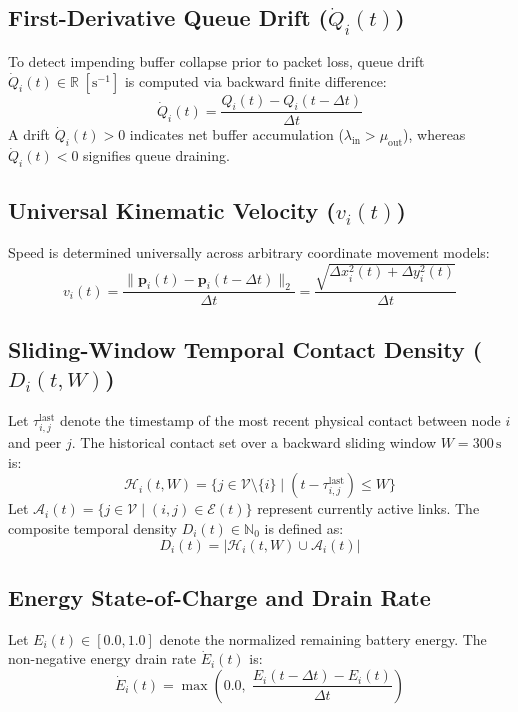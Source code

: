 \documentclass[journal,compsoc]{IEEEtran}
\begin{document}
\subsection{First-Derivative Queue Drift ($\dot{Q}_i(t)$)}
To detect impending buffer collapse prior to packet loss, queue drift $\dot{Q}_i(t) \in \mathbb{R}\;[\mathrm{s}^{-1}]$ is computed via backward finite difference:
\begin{equation}
\dot{Q}_i(t) = \frac{Q_i(t) - Q_i(t - \Delta t)}{\Delta t}
\end{equation}
A drift $\dot{Q}_i(t) > 0$ indicates net buffer accumulation ($\lambda_{\mathrm{in}} > \mu_{\mathrm{out}}$), whereas $\dot{Q}_i(t) < 0$ signifies queue draining.

\subsection{Universal Kinematic Velocity ($v_i(t)$)}
Speed is determined universally across arbitrary coordinate movement models:
\begin{equation}
v_i(t) = \frac{\|\mathbf{p}_i(t) - \mathbf{p}_i(t - \Delta t)\|_2}{\Delta t} = \frac{\sqrt{\Delta x_i^2(t) + \Delta y_i^2(t)}}{\Delta t}
\end{equation}

\subsection{Sliding-Window Temporal Contact Density ($D_i(t, W)$)}
Let $\tau_{i,j}^{\mathrm{last}}$ denote the timestamp of the most recent physical contact between node $i$ and peer $j$. The historical contact set over a backward sliding window $W = 300\,\mathrm{s}$ is:
\begin{equation}
\mathcal{H}_i(t, W) = \bigl\{ j \in \mathcal{V} \setminus \{i\} \;\big|\; (t - \tau_{i,j}^{\mathrm{last}}) \le W \bigr\}
\end{equation}
Let $\mathcal{A}_i(t) = \{j \in \mathcal{V} \mid (i, j) \in \mathcal{E}(t)\}$ represent currently active links. The composite temporal density $D_i(t) \in \mathbb{N}_0$ is defined as:
\begin{equation}
D_i(t) = \bigl| \mathcal{H}_i(t, W) \cup \mathcal{A}_i(t) \bigr|
\end{equation}

\subsection{Energy State-of-Charge and Drain Rate}
Let $E_i(t) \in [0.0, 1.0]$ denote the normalized remaining battery energy. The non-negative energy drain rate $\dot{E}_i(t)$ is:
\begin{equation}
\dot{E}_i(t) = \max\left(0.0, \; \frac{E_i(t - \Delta t) - E_i(t)}{\Delta t}\right)
\end{equation}
\end{document}
